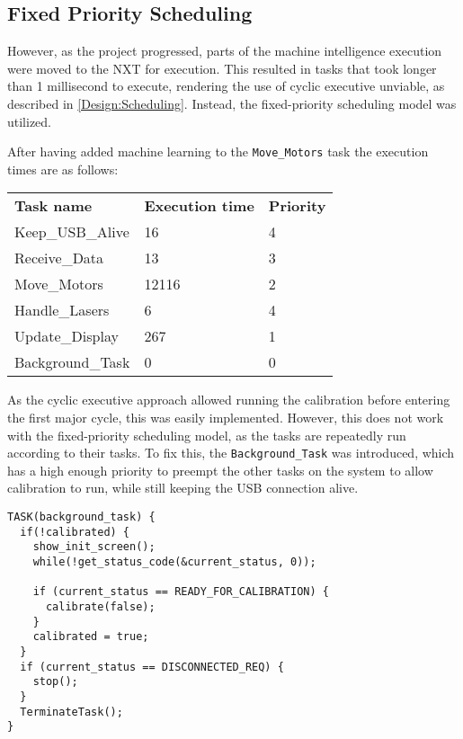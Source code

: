\subsection{Fixed Priority Scheduling}
However, as the project progressed, parts of the machine intelligence execution were moved to the NXT for execution.
This resulted in tasks that took longer than 1 millisecond to execute, rendering the use of cyclic executive unviable, as described in \autoref{Design:Scheduling}.
Instead, the fixed-priority scheduling model was utilized.

After having added machine learning to the \texttt{Move\_Motors} task the execution times are as follows:

\begin{table}[H]
\begin{tabular}{lll}
\textbf{Task name}  & \textbf{Execution time} 	& \textbf{Priority}\\
Keep\_USB\_Alive    & 16                        & 4   \\
Receive\_Data       & 13                        & 3   \\
Move\_Motors        & 12116                     & 2   \\
Handle\_Lasers      & 6                         & 4   \\
Update\_Display     & 267                       & 1   \\
Background\_Task    & 0                         & 0   
\end{tabular}
\end{table}\label{table:executionTimes1}

As the cyclic executive approach allowed running the calibration before entering the first major cycle, this was easily implemented.
However, this does not work with the fixed-priority scheduling model, as the tasks are repeatedly run according to their tasks.
To fix this, the \texttt{Background\_Task} was introduced, which has a high enough priority to preempt the other tasks on the system to allow calibration to run, while still keeping the USB connection alive.

\begin{lstlisting}[language=CSharp,label={lst:backgroundTask},caption={Background task}]
TASK(background_task) {
  if(!calibrated) {
    show_init_screen();
    while(!get_status_code(&current_status, 0));

    if (current_status == READY_FOR_CALIBRATION) {
      calibrate(false);
    }
    calibrated = true;
  }
  if (current_status == DISCONNECTED_REQ) {
    stop();
  }
  TerminateTask();
}
\end{lstlisting}

